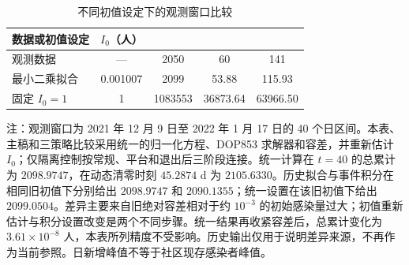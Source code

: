 \documentclass[lang=cn,a4paper,newtx]{elegantpaper}
\renewcommand{\arraystretch}{1.25}
\begin{document}
\clearpage
\begin{table}[htbp]
\centering\small
\setlength{\tabcolsep}{3.5pt}
\renewcommand{\arraystretch}{1.25}
\begin{threeparttable}
\caption{不同初值设定下的观测窗口比较}
\label{tab:sup:initial}
\begin{tabular*}{\linewidth}{@{\extracolsep{\fill}}lS[table-format=1.6]S[table-format=7.0]S[table-format=5.2]S[table-format=5.2]@{}}
\toprule
数据或初值设定 & {$I_0$（人）} & {} & {} & {}\\
\midrule
观测数据 & {---} & 2050 & 60 & 141\\
最小二乘拟合 & 0.001007 & 2099 & 53.88 & 115.93\\
固定 $I_0=1$ & 1 & 1083553 & 36873.64 & 63966.50\\
\bottomrule
\end{tabular*}
\begin{tablenotes}[flushleft]\footnotesize
\item 注：观测窗口为 2021 年 12 月 9 日至 2022 年 1 月 17 日的 40 个日区间。本表、主稿和三策略比较采用统一的归一化方程、DOP853 求解器和容差，并重新估计 $I_0$；仅隔离控制按常规、平台和退出后三阶段连接。统一计算在 $t=40$ 的总累计为 $2098.9747$，在动态清零时刻 $45.2874$ d 为 $2105.6330$。历史拟合与事件积分在相同旧初值下分别给出 $2098.9747$ 和 $2090.1355$；统一设置在该旧初值下给出 $2099.0504$。差异主要来自旧绝对容差相对于约 $10^{-3}$ 的初始感染量过大；初值重新估计与积分设置改变是两个不同步骤。统一结果再收紧容差后，总累计变化为 $3.61\times10^{-8}$ 人，本表所列精度不受影响。历史输出仅用于说明差异来源，不再作为当前参照。日新增峰值不等于社区现存感染者峰值。
\end{tablenotes}
\end{threeparttable}
\end{table}
\clearpage
\end{document}
